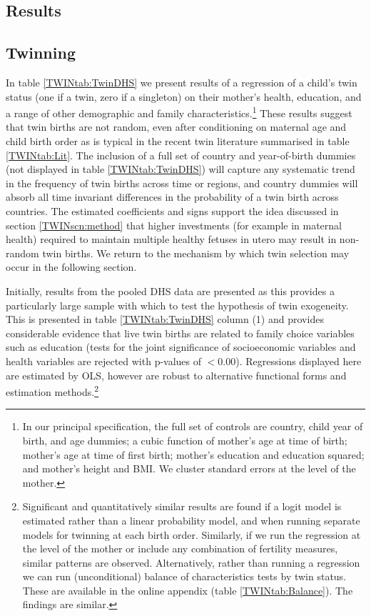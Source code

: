\documentclass[subeqn]{article}
\begin{document}
\begin{spacing}{1.4}
\section{Results}                                  \label{TWINscn:results}
\subsection{Twinning}                              \label{TWINsscn:twinning}
In table \ref{TWINtab:TwinDHS} we present results of a regression of a child's 
twin status (one if a twin, zero if a singleton) on their mother's health, 
education, and a range of other demographic and family characteristics.\footnote{
In our principal specification, the full set of controls are country, child year 
of birth, and age dummies; a cubic function of mother's age at time of birth; 
mother's age at time of first birth; mother's education and education squared; 
and mother's height and BMI. We cluster standard errors at the level of the 
mother.}  These results suggest that twin births are not random, even after 
conditioning on maternal age and child birth order as is typical in the recent 
twin literature summarised in table \ref{TWINtab:Lit}. The inclusion of a full 
set of country and year-of-birth dummies (not displayed in table 
\ref{TWINtab:TwinDHS}) will capture any systematic trend in the frequency of 
twin births across time or regions, and country dummies will absorb all time 
invariant differences in the probability of a twin birth across countries. The 
estimated coefficients and signs support the idea discussed in section 
\ref{TWINscn:method} that higher investments (for example in maternal health) 
required to maintain multiple healthy fetuses in utero may result in non-random 
twin births. We return to the mechanism by which twin selection may occur in 
the following section.

Initially, results from the pooled DHS data are presented as this provides a 
particularly large sample with which to test the hypothesis of twin exogeneity. 
This is presented in table \ref{TWINtab:TwinDHS} column (1) and provides 
considerable evidence that live twin births are related to family choice 
variables such as education (tests for the joint significance of socioeconomic 
variables and health variables are rejected with p-values of $<$0.00).  
Regressions displayed here are estimated by OLS, however are robust to 
alternative functional forms and estimation methods.\footnote{Significant and 
quantitatively similar results are found if a logit model is estimated rather 
than a linear probability model, and when running separate models for twinning at 
each birth order. Similarly, if we run the regression at the level of the mother 
or include any combination of fertility measures, similar patterns are observed.
Alternatively, rather than running a regression we can run (unconditional) balance 
of characteristics tests by twin status.  These are available in the online 
appendix (table \ref{TWINtab:Balance}).  The findings are similar.}


\end{spacing}
\end{document}
